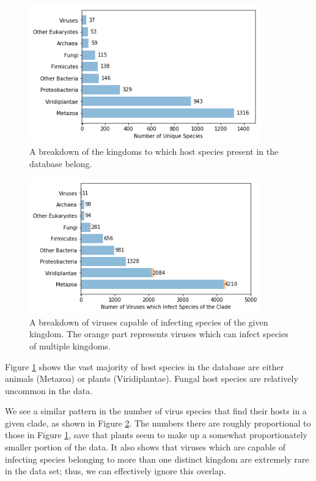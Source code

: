 \documentclass[12pt]{article}
\begin{document}
   
    \begin{figure}[H]
        \begin{center}
            \includegraphics[width=100mm]{host_clades_figure.png}
            \caption{A breakdown of the kingdoms to which host species present in
            the database belong.}
            \label{host_clades_figure}
        \end{center}
    \end{figure}
    \begin{figure}[H]
        \begin{center}
            \includegraphics[width=100mm]{infects_clades_figure.png}
            \caption{A breakdown of viruses capable of infecting species of
            the given kingdom. The orange part represents viruses which can
            infect species of multiple kingdoms.}
            \label{infects_clades_figure}
        \end{center}
    \end{figure}

    Figure \ref{host_clades_figure} shows the vast majority of host species in
    the database are either animals (Metazoa) or plants (Viridiplantae). Fungal
    host species are relatively uncommon in the data.

    We see a similar pattern in the number of virus species that find their
    hosts in a given clade, as shown in Figure \ref{infects_clades_figure}.
    The numbers there are roughly proportional to those in Figure
    \ref{host_clades_figure}, save that plants seem to make up a somewhat
    proportionately smaller portion of the data. It also shows that viruses
    which are capable of infecting species belonging to more than one distinct
    kingdom are extremely rare in the data set; thus, we can effectively ignore
    this overlap.
\end{document}
